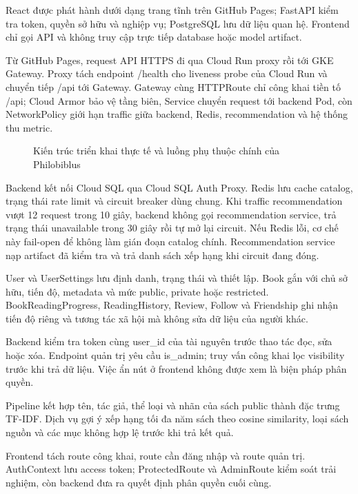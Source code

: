React được phát hành dưới dạng trang tĩnh trên GitHub Pages; FastAPI kiểm tra token, quyền sở hữu và nghiệp vụ; PostgreSQL lưu dữ liệu quan hệ. Frontend chỉ gọi API và không truy cập trực tiếp database hoặc model artifact.

Từ GitHub Pages, request API HTTPS đi qua Cloud Run proxy rồi tới GKE Gateway. Proxy tách endpoint /health cho liveness probe của Cloud Run và chuyển tiếp /api tới Gateway. Gateway cùng HTTPRoute chỉ công khai tiền tố /api; Cloud Armor bảo vệ tầng biên, Service chuyển request tới backend Pod, còn NetworkPolicy giới hạn traffic giữa backend, Redis, recommendation và hệ thống thu metric.

\clearpage
\begin{figure}[H]
\centering

\caption{Kiến trúc triển khai thực tế và luồng phụ thuộc chính của Philobiblus}
\label{fig:1}
\end{figure}
Backend kết nối Cloud SQL qua Cloud SQL Auth Proxy. Redis lưu cache catalog, trạng thái rate limit và circuit breaker dùng chung. Khi traffic recommendation vượt 12 request trong 10 giây, backend không gọi recommendation service, trả trạng thái unavailable trong 30 giây rồi tự mở lại circuit. Nếu Redis lỗi, cơ chế này fail-open để không làm gián đoạn catalog chính. Recommendation service nạp artifact đã kiểm tra và trả danh sách xếp hạng khi circuit đang đóng.

User và UserSettings lưu định danh, trạng thái và thiết lập. Book gắn với chủ sở hữu, tiến độ, metadata và mức public, private hoặc restricted. BookReadingProgress, ReadingHistory, Review, Follow và Friendship ghi nhận tiến độ riêng và tương tác xã hội mà không sửa dữ liệu của người khác.

Backend kiểm tra token cùng user\_id của tài nguyên trước thao tác đọc, sửa hoặc xóa. Endpoint quản trị yêu cầu is\_admin; truy vấn công khai lọc visibility trước khi trả dữ liệu. Việc ẩn nút ở frontend không được xem là biện pháp phân quyền.

Pipeline kết hợp tên, tác giả, thể loại và nhãn của sách public thành đặc trưng TF-IDF. Dịch vụ gợi ý xếp hạng tối đa năm sách theo cosine similarity, loại sách nguồn và các mục không hợp lệ trước khi trả kết quả.

Frontend tách route công khai, route cần đăng nhập và route quản trị. AuthContext lưu access token; ProtectedRoute và AdminRoute kiểm soát trải nghiệm, còn backend đưa ra quyết định phân quyền cuối cùng.

